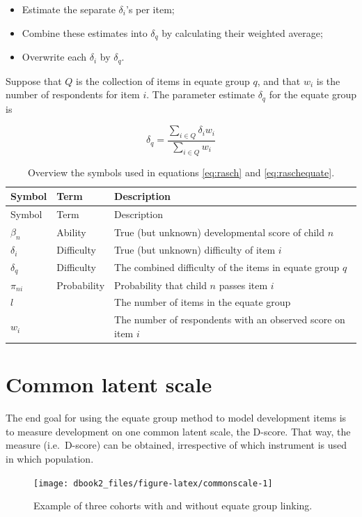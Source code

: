 \documentclass[
]{book}
\providecommand{\tightlist}{%
  \setlength{\itemsep}{0pt}\setlength{\parskip}{0pt}}
\begin{document}
\begin{itemize}
\tightlist
\item
  Estimate the separate \(\delta_i\)'s per item;
\item
  Combine these estimates into \(\delta_q\) by calculating their weighted average;
\item
  Overwrite each \(\delta_i\) by \(\delta_q\).
\end{itemize}

Suppose that \(Q\) is the collection of items in equate group \(q\), and that \(w_i\) is the number of respondents for item \(i\). The parameter estimate \(\delta_q\) for the equate group is

\begin{equation}
\delta_q = \frac{\sum_{i\in Q} \delta_iw_i}{\sum_{i\in Q} w_i} \label{eq:raschequate}
\end{equation}

\begin{longtable}[]{@{}lll@{}}
\caption{\label{tab:symbols} Overview the symbols used in equations \eqref{eq:rasch} and \eqref{eq:raschequate}.}\tabularnewline
\toprule
Symbol & Term & Description\tabularnewline
\midrule
\endfirsthead
\toprule
Symbol & Term & Description\tabularnewline
\midrule
\endhead
\(\beta_n\) & Ability & True (but unknown) developmental score of child \(n\)\tabularnewline
\(\delta_i\) & Difficulty & True (but unknown) difficulty of item \(i\)\tabularnewline
\(\delta_q\) & Difficulty & The combined difficulty of the items in equate group \(q\)\tabularnewline
\(\pi_{ni}\) & Probability & Probability that child \(n\) passes item \(i\)\tabularnewline
\(l\) & & The number of items in the equate group\tabularnewline
\(w_i\) & & The number of respondents with an observed score on item \(i\)\tabularnewline
\bottomrule
\end{longtable}

\hypertarget{sec:commonscale}{%
\section{Common latent scale}\label{sec:commonscale}}

The end goal for using the equate group method to model development items is to measure development on one common latent scale, the D-score. That way, the measure (i.e.~D-score) can be obtained, irrespective of which instrument is used in which population.

\begin{figure}

{\centering \texttt{[image: dbook2\_files/figure-latex/commonscale-1]} 

}

\caption{Example of three cohorts with and without equate group linking.}\label{fig:commonscale}
\end{figure}
\end{document}
